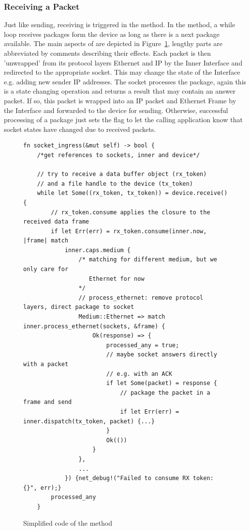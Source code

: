 \subsubsection{Receiving a Packet}

Just like sending, receiving is triggered in the  method. In the  method, a while loop receives packages form the device as long as there is a next package available. The main aspects of  are depicted in Figure~\ref{fig:socketIngressCode}, lengthy parts are abbreviated by \rust{/**/}comments describing their effects.
Each packet is then 'unwrapped' from its protocol layers Ethernet and IP by the Inner Interface and redirected to the appropriate socket.  This may change the state of the Interface e.g. adding new sender IP addresses. The socket processes the package, again this is a state changing operation and returns a result that may contain an answer packet. If so, this packet is wrapped into an IP packet and Ethernet Frame by the Interface and forwarded to the device for sending. Otherwise, successful processing of a package just sets the  flag to let the calling application know that socket states have changed due to received packets.  

\begin{figure}[H]
    \centering
\begin{verbatim}
fn socket_ingress(&mut self) -> bool {
    /*get references to sockets, inner and device*/
    
    // try to receive a data buffer object (rx_token) 
    // and a file handle to the device (tx_token)
    while let Some((rx_token, tx_token)) = device.receive() {
        // rx_token.consume applies the closure to the received data frame
        if let Err(err) = rx_token.consume(inner.now, |frame| match
            inner.caps.medium {
                /* matching for different medium, but we only care for 
                   Ethernet for now
                */
                // process_ethernet: remove protocol layers, direct package to socket
                Medium::Ethernet => match inner.process_ethernet(sockets, &frame) {
                    Ok(response) => {
                        processed_any = true;
                        // maybe socket answers directly with a packet
                        // e.g. with an ACK 
                        if let Some(packet) = response {
                            // package the packet in a frame and send
                            if let Err(err) = inner.dispatch(tx_token, packet) {...}
                        }
                        Ok(())
                    }
                },
                ...
            }) {net_debug!("Failed to consume RX token: {}", err);}
        processed_any
    }
\end{verbatim}
    \caption{Simplified code of the  method}
    \label{fig:socketIngressCode}
\end{figure}

